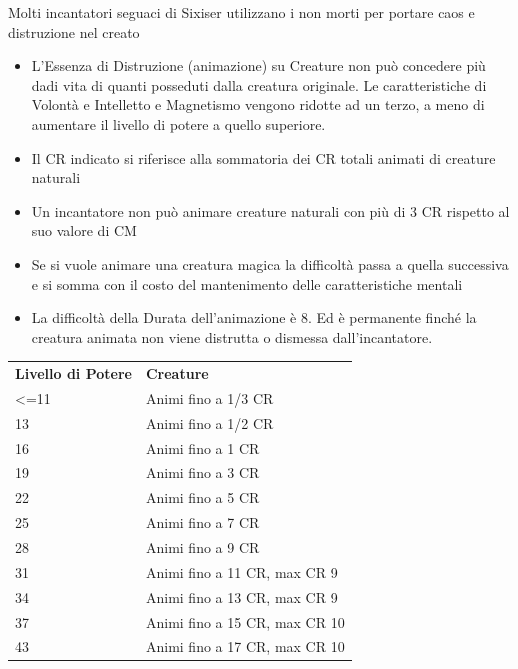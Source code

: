 \documentclass[a4paper,11pt,twoside,openany]{book}
\begin{document}
Molti incantatori seguaci di Sixiser utilizzano i non morti per portare caos e distruzione nel creato

\begin{itemize}
	\item
	      L'Essenza di Distruzione (animazione) su Creature non può concedere più dadi vita di quanti posseduti dalla creatura originale. Le caratteristiche di Volontà e Intelletto e Magnetismo vengono ridotte ad un terzo, a meno di aumentare il livello di potere a quello superiore.
	\item
	      Il CR indicato si riferisce alla sommatoria dei CR totali animati di creature naturali
	\item
	      Un incantatore non può animare creature naturali con più di 3 CR rispetto al suo valore di CM
	\item
	      Se si vuole animare una creatura magica la difficoltà passa a quella successiva e si somma con il costo del mantenimento delle caratteristiche mentali
	\item
	      La difficoltà della Durata dell'animazione è 8. Ed è permanente finché la creatura animata non viene distrutta o dismessa dall'incantatore.
\end{itemize}

\bigskip

\begin{tabularx}{0.95\textwidth}{lX}
	\toprule
	\textbf{Livello di Potere} & \textbf{Creature}\\
	\textless=11               & Animi fino a 1/3 CR\\
	13                         & Animi fino a 1/2 CR\\
	16                         & Animi fino a 1 CR\\
	19                         & Animi fino a 3 CR\\
	22                         & Animi fino a 5 CR\\
	25                         & Animi fino a 7 CR\\
	28                         & Animi fino a 9 CR\\
	31                         & Animi fino a 11 CR, max CR 9\\
	34                         & Animi fino a 13 CR, max CR 9\\
	37                         & Animi fino a 15 CR, max CR 10\\
	43                         & Animi fino a 17 CR, max CR 10\\
\end{tabularx}
\end{document}
